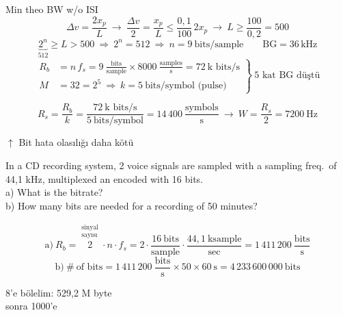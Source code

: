 \documentclass[11pt,a4paper]{article}
\begin{document}
Min theo BW w/o ISI
\[ \Delta v=\frac{2x_p}{L}\ \rightarrow\ \frac{\Delta v}{2}=\frac{x_p}{L}\le\frac{0{,}1}{100}\,2x_p\ \rightarrow\ L\ge\frac{100}{0{,}2}=500 \]
\[ \underbrace{2^n}_{512}\ge L>500\ \Rightarrow\ 2^n=512\ \Rightarrow\ n=9\ \text{bits/sample}\qquad \mathrm{BG}=36\,\mathrm{kHz} \]
\[
\left.\begin{aligned}
R_b&=n\,f_s=9\ \frac{\text{bits}}{\text{sample}}\times 8000\ \frac{\text{samples}}{\text{s}}=72\ \text{k bits/s}\\
M&=32=2^5\ \Rightarrow\ k=5\ \text{bits/symbol (pulse)}
\end{aligned}\right\}\ \text{5 kat BG düştü}
\]

\[ R_s=\frac{R_b}{k}=\frac{72\ \text{k bits/s}}{5\ \text{bits/symbol}}=14\,400\ \frac{\text{symbols}}{\text{s}}\ \rightarrow\ W=\frac{R_s}{2}=7200\ \mathrm{Hz} \]
\begin{flushright}
$\uparrow$ Bit hata olasılığı daha kötü
\end{flushright}

\begin{ornek}
In a CD recording system, 2 voice signals are sampled with a sampling freq.\ of 44,1 kHz, multiplexed an encoded with 16 bits.\\
a) What is the bitrate?\\
b) How many bits are needed for a recording of 50 minutes?
\end{ornek}

\[ \text{a)}\ R_b=\overset{\substack{\text{sinyal}\\ \text{sayısı}}}{2}\cdot n\cdot f_s=2\cdot\frac{16\ \text{bits}}{\text{sample}}\cdot\frac{44{,}1\ \text{ksample}}{\text{sec}}=1\,411\,200\ \frac{\text{bits}}{\text{s}} \]
\[ \text{b)}\ \#\ \text{of bits}=1\,411\,200\ \frac{\text{bits}}{\text{s}}\times 50\times 60\ \text{s}=4\,233\,600\,000\ \text{bits} \]
\begin{flushright}
8'e bölelim: 529,2 M byte\\
sonra 1000'e
\end{flushright}

\begin{ornek}[3.9]
\end{ornek}
\end{document}
